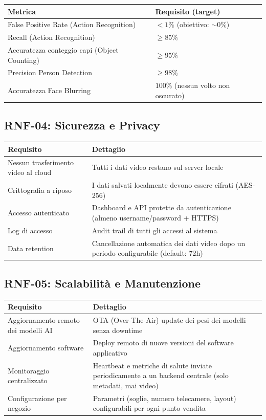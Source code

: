\documentclass[a4paper, 12pt]{article}
\begin{document}
\begin{tabularx}{\textwidth}{lL}
    \toprule
    \textbf{Metrica} & \textbf{Requisito (target)} \\
    \midrule
    False Positive Rate (Action Recognition) & $< 1\%$ (obiettivo: $\sim 0\%$) \\
    Recall (Action Recognition) & $\geq 85\%$ \\
    Accuratezza conteggio capi (Object Counting) & $\geq 95\%$ \\
    Precision Person Detection & $\geq 98\%$ \\
    Accuratezza Face Blurring & $100\%$ (nessun volto non oscurato) \\
    \bottomrule
\end{tabularx}

\subsection{RNF-04: Sicurezza e Privacy}

\begin{tabularx}{\textwidth}{lL}
    \toprule
    \textbf{Requisito} & \textbf{Dettaglio} \\
    \midrule
    Nessun trasferimento video al cloud & Tutti i dati video restano sul server locale \\
    Crittografia a riposo & I dati salvati localmente devono essere cifrati (AES-256) \\
    Accesso autenticato & Dashboard e API protette da autenticazione (almeno username/password + HTTPS) \\
    Log di accesso & Audit trail di tutti gli accessi al sistema \\
    Data retention & Cancellazione automatica dei dati video dopo un periodo configurabile (default: 72h) \\
    \bottomrule
\end{tabularx}

\subsection{RNF-05: Scalabilità e Manutenzione}

\begin{tabularx}{\textwidth}{lL}
    \toprule
    \textbf{Requisito} & \textbf{Dettaglio} \\
    \midrule
    Aggiornamento remoto dei modelli AI & OTA (Over-The-Air) update dei pesi dei modelli senza downtime \\
    Aggiornamento software & Deploy remoto di nuove versioni del software applicativo \\
    Monitoraggio centralizzato & Heartbeat e metriche di salute inviate periodicamente a un backend centrale (solo metadati, mai video) \\
    Configurazione per negozio & Parametri (soglie, numero telecamere, layout) configurabili per ogni punto vendita \\
    \bottomrule
\end{tabularx}
\end{document}
